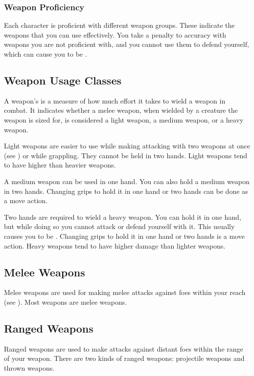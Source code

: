         \subsubsection{Weapon Proficiency}\label{Weapon Proficiency}
            Each character is proficient with different weapon groups. These indicate the weapons that you can use effectively. You take a  penalty to accuracy with weapons you are not proficient with, and you cannot use them to defend yourself, which can cause you to be .

    \subsection{Weapon Usage Classes}\label{Weapon Usage Classes}
        A weapon's  is a measure of how much effort it takes to wield a weapon in combat.
        It indicates whether a melee weapon, when wielded by a creature the weapon is sized for, is considered a light weapon, a medium weapon, or a heavy weapon.

        \label{Light Weapons} Light weapons are easier to use while making attacking with two weapons at once (see ) or while grappling.
        They cannot be held in two hands.
        Light weapons tend to have higher  than heavier weapons.

         A medium weapon can be used in one hand. You can also hold a medium weapon in two hands. Changing grips to hold it in one hand or two hands can be done as a move action.

         Two hands are required to wield a heavy weapon.
        You can hold it in one hand, but while doing so you cannot attack or defend yourself with it.
        This usually causes you to be .
        Changing grips to hold it in one hand or two hands is a move action.
        Heavy weapons tend to have higher damage than lighter weapons.


    \subsection{Melee Weapons}
        Melee weapons are used for making melee attacks against foes within your reach (see ). Most weapons are melee weapons.

    \subsection{Ranged Weapons}
        Ranged weapons are used to make attacks against distant foes within the range of your weapon. There are two kinds of ranged weapons: projectile weapons and thrown weapons.

